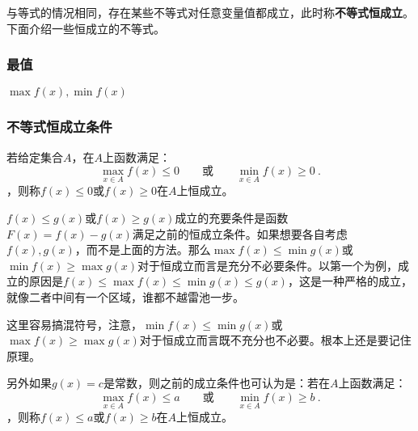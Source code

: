 与等式的情况相同，存在某些不等式对任意变量值都成立，此时称\textbf{不等式恒成立}。下面介绍一些恒成立的不等式。

\subsubsection{最值}

$\max f(x),\min f(x)$

\subsubsection{不等式恒成立条件}

若给定集合$A$，在$A$上函数满足：
\begin{equation}
\displaystyle\max_{x\in A} f(x)\leq 0\qquad\text{或}\qquad\min_{x\in A} f(x)\geq 0~.
\end{equation}
，则称$f(x)\leq 0$或$f(x)\geq 0$在$A$上恒成立。

$f(x)\leq g(x)$或$f(x)\geq g(x)$成立的充要条件是函数$F(x)=f(x)-g(x)$满足之前的恒成立条件。如果想要各自考虑$f(x),g(x)$，而不是上面的方法。那么$\max f(x)\leq\min g(x)$或$\min f(x)\geq\max g(x)$对于恒成立而言是充分不必要条件。以第一个为例，成立的原因是$f(x)\leq\max f(x)\leq\min g(x)\leq g(x)$，这是一种严格的成立，就像二者中间有一个区域，谁都不越雷池一步。

这里容易搞混符号，注意，$\min f(x)\leq\min g(x)$或$\max f(x)\geq\max g(x)$对于恒成立而言既不充分也不必要。根本上还是要记住原理。

另外如果$g(x)=c$是常数，则之前的成立条件也可认为是：若在$A$上函数满足：
\begin{equation}
\displaystyle\max_{x\in A} f(x)\leq a\qquad\text{或}\qquad\min_{x\in A} f(x)\geq b~.
\end{equation}
，则称$f(x)\leq a$或$f(x)\geq b$在$A$上恒成立。

